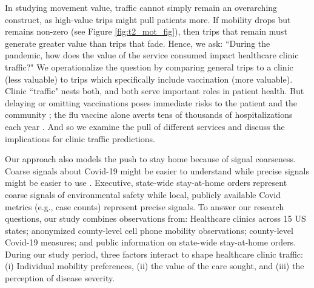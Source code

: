  In studying movement value, traffic cannot simply remain an overarching construct, as high-value trips might pull patients more. If mobility drops but remains non-zero (see Figure \ref{fig:t2_mot_fig}), then trips that remain must generate greater value than trips that fade. Hence, we ask: “During the pandemic, how does the value of the service consumed impact healthcare clinic traffic?" We operationalize the question by comparing general trips to a clinic (less valuable) to trips which specifically include vaccination (more valuable). Clinic “traffic" nests both, and both serve important roles in patient health. But delaying or omitting vaccinations poses immediate risks to the patient and the community \citep{Salmon2015,Brewer2017}; the flu vaccine alone averts tens of thousands of hospitalizations each year \citep{CDC2020}. And so we examine the pull of different services and discuss the implications for clinic traffic predictions. 

 Our approach also models the push to stay home because of signal coarseness. Coarse signals about Covid-19 might be easier to understand while precise signals might be easier to use \citep{Morris2007}. Executive, state-wide stay-at-home orders represent coarse signals of environmental safety while local, publicly available Covid metrics (e.g., case counts) represent precise signals. To answer our research questions, our study combines observations from: Healthcare clinics across 15 US states; anonymized county-level cell phone mobility observations; county-level Covid-19 measures; and public information on state-wide stay-at-home orders. During our study period, three factors interact to shape healthcare clinic traffic: (i) Individual mobility preferences, (ii) the value of the care sought, and (iii) the perception of disease severity.
 
